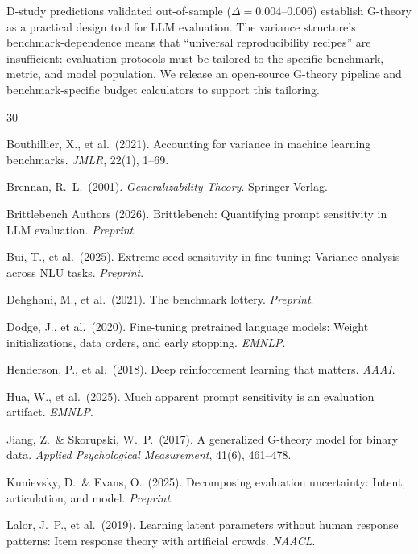 \documentclass[11pt]{article}
\begin{document}
D-study predictions validated out-of-sample ($\Delta = 0.004$--$0.006$) establish G-theory as a practical design tool for LLM evaluation.
The variance structure's benchmark-dependence means that ``universal reproducibility recipes'' are insufficient: evaluation protocols must be tailored to the specific benchmark, metric, and model population.
We release an open-source G-theory pipeline and benchmark-specific budget calculators to support this tailoring.

\begin{thebibliography}{30}

Bouthillier, X., et al.\ (2021).
Accounting for variance in machine learning benchmarks.
\textit{JMLR}, 22(1), 1--69.

Brennan, R.~L.\ (2001).
\textit{Generalizability Theory}.
Springer-Verlag.

Brittlebench Authors (2026).
Brittlebench: Quantifying prompt sensitivity in LLM evaluation.
\textit{Preprint}.

Bui, T., et al.\ (2025).
Extreme seed sensitivity in fine-tuning: Variance analysis across NLU tasks.
\textit{Preprint}.

Dehghani, M., et al.\ (2021).
The benchmark lottery.
\textit{Preprint}.

Dodge, J., et al.\ (2020).
Fine-tuning pretrained language models: Weight initializations, data orders, and early stopping.
\textit{EMNLP}.

Henderson, P., et al.\ (2018).
Deep reinforcement learning that matters.
\textit{AAAI}.

Hua, W., et al.\ (2025).
Much apparent prompt sensitivity is an evaluation artifact.
\textit{EMNLP}.

Jiang, Z.\ \& Skorupski, W.~P.\ (2017).
A generalized G-theory model for binary data.
\textit{Applied Psychological Measurement}, 41(6), 461--478.

Kunievsky, D.\ \& Evans, O.\ (2025).
Decomposing evaluation uncertainty: Intent, articulation, and model.
\textit{Preprint}.

Lalor, J.~P., et al.\ (2019).
Learning latent parameters without human response patterns: Item response theory with artificial crowds.
\textit{NAACL}.


\end{thebibliography}
\end{document}
